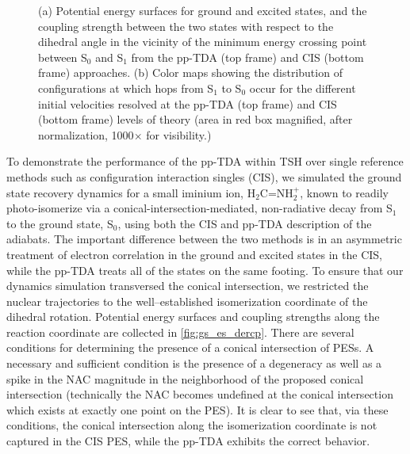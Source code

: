 \documentclass[12pt]{article}
\begin{document}
\begin{figure}[h!]
\begin{subfigure}[b]{0.40\textwidth}
  \caption{ }
  \label{fig:hops}
  \end{subfigure}
  \caption{\footnotesize (a) Potential energy surfaces for ground and excited
  states, and the coupling strength between the two states with respect to the
  dihedral angle in the vicinity of the minimum energy crossing point between
  S$_0$ and S$_1$ from the pp-TDA (top frame) and CIS (bottom frame) approaches.
  (b) Color maps showing the distribution of configurations at which hops from
  S$_1$ to S$_0$ occur for the different initial velocities resolved at the
  pp-TDA (top frame) and CIS (bottom frame) levels of theory (area in red box
  magnified, after normalization, 1000$\times$ for visibility.)}
\end{figure}

To demonstrate the performance of the pp-TDA within TSH over single reference
methods such as configuration interaction singles (CIS), we simulated the ground
state recovery dynamics for a small iminium ion, H$_2$C=NH$_2^+$, known to
readily photo-isomerize via a conical-intersection-mediated, non-radiative decay
from S$_1$ to the ground state, S$_0$, using both the CIS and pp-TDA description
of the adiabats. The important difference between the two methods is in an
asymmetric treatment of electron correlation in the ground and excited states in
the CIS, while the pp-TDA treats all of the states on the same footing. To
ensure that our dynamics simulation transversed the conical intersection, we
restricted the nuclear trajectories to the well--established isomerization
coordinate of the dihedral rotation.  Potential energy surfaces and coupling
strengths along the reaction coordinate are collected in \cref{fig:gs_es_dercp}. 
There are several conditions for determining the presence of a conical
intersection of PESs. A necessary and sufficient condition is the presence of a
degeneracy as well as a spike in the NAC magnitude in the neighborhood of the
proposed conical intersection (technically the NAC becomes undefined at the
conical intersection which exists at exactly one point on the PES).
It is clear to see that, via these conditions, the conical intersection along
the isomerization coordinate is not captured in the CIS PES, while the pp-TDA
exhibits the correct behavior.
\end{document}
